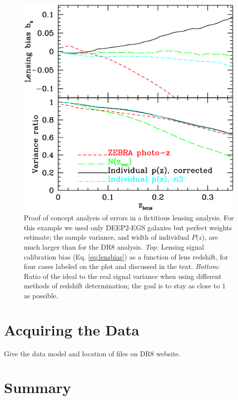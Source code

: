 \documentclass[preprint]{aastex}
\newcommand{\pofz}{$P(z$)}
\begin{document}
\begin{figure} [h]\centering
    \includegraphics[scale=0.5]{figures/pz.egs.c3.paper.final.ps}

    \caption{ Proof of concept analysis of errors in a fictitious lensing
    analysis.  For this example we used only DEEP2-EGS galaxies but perfect
    weights estimate; the sample variance, and width of individual \pofz, are
    much larger than for the DR8 analysis.  {\em Top:} Lensing signal
    calibration bias (Eq.  \ref{eq:lensbias}) as a function of lens redshift,
    for four  cases labeled on the plot and discussed in the text.  {\em
    Bottom:}  Ratio of the ideal to the real signal variance when using
    different  methods of redshift determination; the goal is to stay as close
    to $1$  as possible.  \label{fig:simplebias}}

\end{figure}



\section{Acquiring the Data} \label{sec:get}

{\color{red} Give the data model and location  of files on DR8 website. }

\section{Summary} \label{sec:summary}
\end{document}
